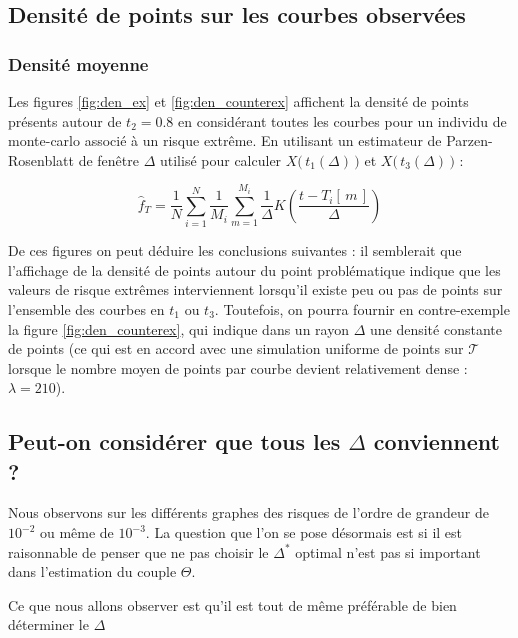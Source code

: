 \subsection{Densité de points sur les courbes observées}

\subsubsection{Densité moyenne}

Les figures \ref{fig:den_ex} et \ref{fig:den_counterex} affichent la densité de points présents autour de $t_2 = 0.8$ en considérant toutes les courbes pour un individu de monte-carlo associé à un risque extrême. En utilisant un estimateur de Parzen-Rosenblatt de fenêtre $\Delta$ utilisé pour calculer $X\bigl( \, t_1(\Delta) \, \bigr)$ et $X\bigl( \, t_3(\Delta) \, \bigr)$ :

\begin{equation*}
	\widehat f_T = \frac 1 N \sum\limits_{i=1}^N \frac 1 {M_i} \sum\limits_{m=1}^{M_i} \frac 1 \Delta K\left( \frac{t - T_i[\, m \, ]}{\Delta} \right)
\end{equation*}

De ces figures on peut déduire les conclusions suivantes : il semblerait que l'affichage de la densité de points autour du point problématique indique que les valeurs de risque extrêmes interviennent lorsqu'il existe peu ou pas de points sur l'ensemble des courbes en $t_1$ ou $t_3$. Toutefois, on pourra fournir en contre-exemple la figure \ref{fig:den_counterex}, qui indique dans un rayon $\Delta$ une densité constante de points (ce qui est en accord avec une simulation uniforme de points sur $\mathcal T$ lorsque le nombre moyen de points par courbe devient relativement dense : $\lambda = 210$).



\subsection{Peut-on considérer que tous les $\Delta$ conviennent ?}
\label{annexe:tous_theta_conviennent_borne_norme_theta}

Nous observons sur les différents graphes des risques de l'ordre de grandeur de $10^{-2}$ ou même de $10^{-3}$. La question que l'on se pose désormais est si il est raisonnable de penser que ne pas choisir le $\Delta^*$ optimal n'est pas si important dans l'estimation du couple $\Theta$.

Ce que nous allons observer est qu'il est tout de même préférable de bien déterminer le $\Delta$

